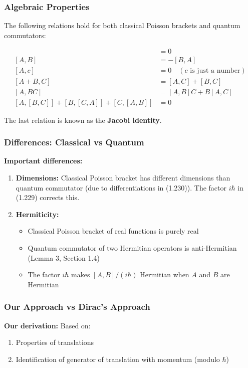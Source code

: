\documentclass[11pt,a4paper]{article}
\begin{document}
\subsubsection{Algebraic Properties}

The following relations hold for both classical Poisson brackets and quantum commutators:

\begin{align}
[A, A] &= 0 \tag{1.232a} \\
[A, B] &= -[B, A] \tag{1.232b} \\
[A, c] &= 0 \quad (c \text{ is just a number}) \tag{1.232c} \\
[A + B, C] &= [A, C] + [B, C] \tag{1.232d} \\
[A, BC] &= [A, B]C + B[A, C] \tag{1.232e} \\
[A, [B, C]] + [B, [C, A]] + [C, [A, B]] &= 0 \tag{1.232f}
\end{align}

The last relation is known as the \textbf{Jacobi identity}.

\subsubsection{Differences: Classical vs Quantum}

\textbf{Important differences:}
\begin{enumerate}
\item \textbf{Dimensions:} Classical Poisson bracket has different dimensions than quantum commutator (due to differentiations in (1.230)). The factor $i\hbar$ in (1.229) corrects this.

\item \textbf{Hermiticity:} 
\begin{itemize}
\item Classical Poisson bracket of real functions is purely real
\item Quantum commutator of two Hermitian operators is anti-Hermitian (Lemma 3, Section 1.4)
\item The factor $i\hbar$ makes $[A,B]/(i\hbar)$ Hermitian when $A$ and $B$ are Hermitian
\end{itemize}
\end{enumerate}

\subsubsection{Our Approach vs Dirac's Approach}

\textbf{Our derivation:} Based on:
\begin{enumerate}
\item Properties of translations
\item Identification of generator of translation with momentum (modulo $\hbar$)
\end{enumerate}
\end{document}
